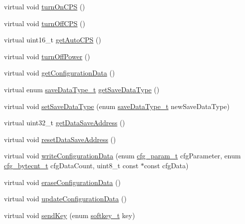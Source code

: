 \begin{DoxyCompactItemize}
\item 
virtual void \hyperlink{class_g_q_l_l_c_1_1_g_q_g_m_c_ad314bf94bddc06aa386740ab1e81909f}{turn\-On\-C\-P\-S} ()
\item 
virtual void \hyperlink{class_g_q_l_l_c_1_1_g_q_g_m_c_a17e164a4075415601d1d94411804fcec}{turn\-Off\-C\-P\-S} ()
\item 
virtual uint16\-\_\-t \hyperlink{class_g_q_l_l_c_1_1_g_q_g_m_c_a4a2176855e1234ee4921a7936e800484}{get\-Auto\-C\-P\-S} ()
\item 
virtual void \hyperlink{class_g_q_l_l_c_1_1_g_q_g_m_c_a0008eca34834ea7f7bb4e65afd6c4c12}{turn\-Off\-Power} ()
\item 
virtual void \hyperlink{class_g_q_l_l_c_1_1_g_q_g_m_c_af1daeb95f4e36d4a7d9109f24b41366c}{get\-Configuration\-Data} ()
\item 
virtual enum \hyperlink{namespace_g_q_l_l_c_a7be2f7bfc833f19ef45df98b80e4f2da}{save\-Data\-Type\-\_\-t} \hyperlink{class_g_q_l_l_c_1_1_g_q_g_m_c_ac5ca40a3cba8ee82d13be775b118a42b}{get\-Save\-Data\-Type} ()
\item 
virtual void \hyperlink{class_g_q_l_l_c_1_1_g_q_g_m_c_a88e93958c5041ceb6635de09aed0706c}{set\-Save\-Data\-Type} (enum \hyperlink{namespace_g_q_l_l_c_a7be2f7bfc833f19ef45df98b80e4f2da}{save\-Data\-Type\-\_\-t} new\-Save\-Data\-Type)
\item 
virtual uint32\-\_\-t \hyperlink{class_g_q_l_l_c_1_1_g_q_g_m_c_ab967994f2de6badb1fafd79acd4d9a5a}{get\-Data\-Save\-Address} ()
\item 
virtual void \hyperlink{class_g_q_l_l_c_1_1_g_q_g_m_c_a9a8937d50bb1ea97b248ce23763a85e0}{reset\-Data\-Save\-Address} ()
\item 
virtual void \hyperlink{class_g_q_l_l_c_1_1_g_q_g_m_c_a657937277b885e17742747b953ecfe63}{write\-Configuration\-Data} (enum \hyperlink{namespace_g_q_l_l_c_a1f1c7fc6febe3329e3972c8d6453e223}{cfg\-\_\-param\-\_\-t} cfg\-Parameter, enum \hyperlink{namespace_g_q_l_l_c_a4ea273cc1167882c32dd27cea1d5572b}{cfg\-\_\-bytecnt\-\_\-t} cfg\-Data\-Count, uint8\-\_\-t const $\ast$const cfg\-Data)
\item 
virtual void \hyperlink{class_g_q_l_l_c_1_1_g_q_g_m_c_a9f38ea216b19e29129c5536a79250e12}{erase\-Configuration\-Data} ()
\item 
virtual void \hyperlink{class_g_q_l_l_c_1_1_g_q_g_m_c_a63a38979232ed9a52a7d26ce3e199548}{update\-Configuration\-Data} ()
\item 
virtual void \hyperlink{class_g_q_l_l_c_1_1_g_q_g_m_c_a5e0450a7600461c7f8d914a4ce60b8c7}{send\-Key} (enum \hyperlink{namespace_g_q_l_l_c_abbd060673d9c9d98e03cf12f3a7c0162}{softkey\-\_\-t} key)
\end{DoxyCompactItemize}
